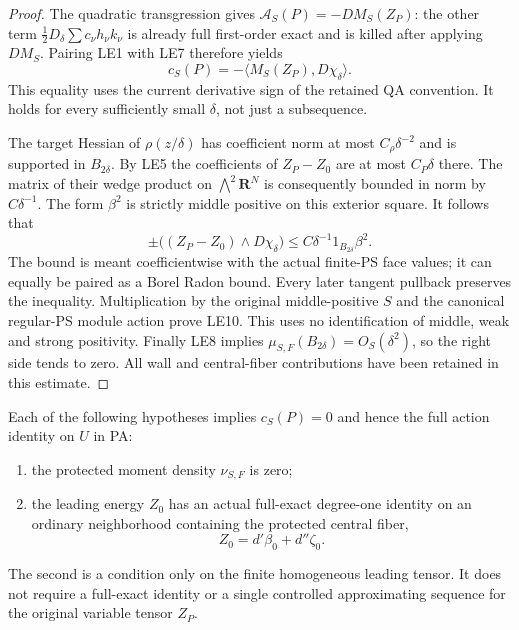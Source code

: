 \begin{proof}
The quadratic transgression gives
$\mathcal A_S(P)=-D M_S(Z_P)$: the other term
$\tfrac12D_\delta\sum c_\nu h_\nu k_\nu$ is already full
first-order exact and is killed after applying $D M_S$.
Pairing LE1 with LE7 therefore yields
\[
                    c_S(P)=-\langle M_S(Z_P),D\chi_\delta\rangle.
 \tag{LE11}
\]
This equality uses the current derivative sign of the retained
QA convention.  It holds for every sufficiently small $\delta$,
not just a subsequence.

The target Hessian of $\rho(z/\delta)$ has coefficient norm
at most $C_\rho\delta^{-2}$ and is supported in $B_{2\delta}$.
By LE5 the coefficients of $Z_P-Z_0$ are at most $C_P\delta$
there.  The matrix of their wedge product on
$\bigwedge^2\mathbf R^N$ is consequently bounded in norm by
$C\delta^{-1}$.  The form $\beta^2$ is strictly middle
positive on this exterior square.  It follows that
\[
 \pm\bigl((Z_P-Z_0)\wedge D\chi_\delta\bigr)
       \le C\delta^{-1}1_{B_{2\delta}}\beta^2.
 \tag{LE12}
\]
The bound is meant coefficientwise with the actual finite-PS
face values; it can equally be paired as a Borel Radon bound.
Every later tangent pullback preserves the inequality.
Multiplication by the original middle-positive $S$ and the
canonical regular-PS module action prove LE10.  This uses no
identification of middle, weak and strong positivity.
Finally LE8 implies $\mu_{S,F}(B_{2\delta})=O_S(\delta^2)$,
so the right side tends to zero.  All wall and central-fiber
contributions have been retained in this estimate.
\end{proof}

\begin{corollary}
\label{cor:r13-leading-energy-cancellations}
Each of the following hypotheses implies $c_S(P)=0$ and
hence the full action identity on $U$ in PA:
\begin{enumerate}
\item the protected moment density $\nu_{S,F}$ is zero;
\item the leading energy $Z_0$ has an actual full-exact
degree-one identity on an ordinary neighborhood containing
the protected central fiber,
\[
                         Z_0=d'\beta_0+d''\zeta_0.
 \tag{LE13}
\]
\end{enumerate}
The second is a condition only on the finite homogeneous
leading tensor.  It does not require a full-exact identity
or a single controlled approximating sequence for the original
variable tensor $Z_P$.
\end{corollary}

